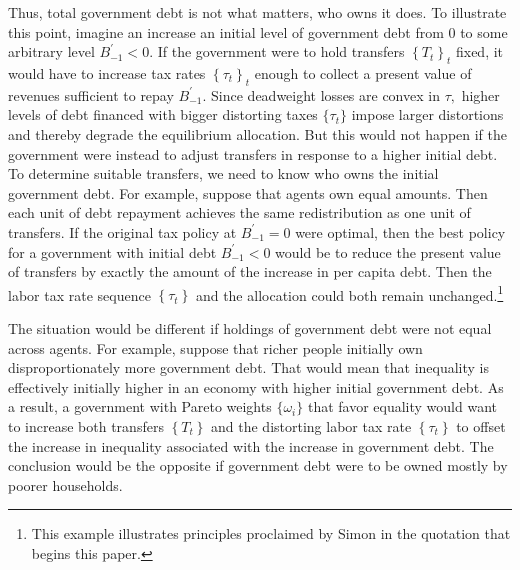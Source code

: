 \documentclass[thmsb,11pt]{article}
\begin{document}
Thus, total government debt is not what matters, who owns it does.
To  illustrate this point,
imagine an increase an
initial level of government debt from $0$ to some arbitrary level $%
B_{-1}^{\prime } < 0$. If the government were to hold transfers $\left\{ T_{t}\right\} _{t}$ fixed, it would
 have  to increase  tax rates $\left\{ \tau
_{t}\right\} _{t}$ enough to collect a present value of revenues sufficient to
repay $B_{-1}^{\prime }$. Since deadweight losses are convex in $\tau ,$
higher levels of debt financed with bigger distorting taxes $\{\tau_t\}$  impose larger
distortions and thereby degrade the equilibrium allocation.  But this would not happen  if
the government were instead  to adjust transfers in response to a higher initial debt. To determine suitable transfers, we need to
know who owns  the initial government debt. For example, suppose that agents own equal amounts. Then
each unit of debt repayment achieves the same redistribution as one
unit of transfers. If the original tax policy  at $B_{-1}^{\prime } =0 $ were optimal, then  the best policy for a government with  initial debt $%
B_{-1}^{\prime } <0 $ would be to reduce the present value of  transfers by exactly the amount of the
increase in per capita debt. Then the labor  tax rate sequence  $\left\{ \tau
_{t}\right\} $ and the allocation could both remain unchanged.\footnote{This example illustrates
principles proclaimed by Simon \citet[p. 85]{newcomb1865critical} in the quotation that begins
 this paper.}


The situation would be different if  holdings of government
debt were not equal across agents. For example, suppose  that  richer people initially  own disproportionately more government debt. That would mean that inequality
is  effectively initially  higher in an economy with higher initial government debt. As a result, a
government with Pareto weights $\{\omega_i\}$ that favor equality would want to increase both   transfers $\left\{ T_{t}\right\} $  and the distorting labor  tax rate $\left\{ \tau _{t}\right\} $
to offset the increase in inequality
associated with the increase in government debt. The conclusion would be the
opposite if government debt were to be  owned mostly by poorer
households.
\end{document}
